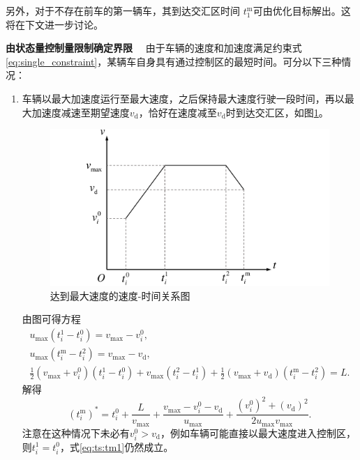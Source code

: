 另外，对于不存在前车的第一辆车，其到达交汇区时间 $t_1^\mathrm{m}$可由优化目标解出。这将在下文进一步讨论。

\textbf{由状态量控制量限制确定界限}
\ \ 由于车辆的速度和加速度满足约束式\eqref{eq:single_constraint}，某辆车自身具有通过控制区的最短时间。可分以下三种情况：
\begin{enumerate}[label=(\arabic*), wide=\parindent]
\item 车辆以最大加速度运行至最大速度，之后保持最大速度行驶一段时间，再以最大加速度减速至期望速度$v_\mathrm{d}$，恰好在速度减至$v_\mathrm{d}$时到达交汇区，如图\ref{fig:vmax}。
\begin{figure}[htbp]
\centering
\includegraphics[width=12cm]{figures/vmax.pdf}
\caption{达到最大速度的速度-时间关系图}
\label{fig:vmax}
\end{figure}

由图可得方程
\begin{gather}
u_{\max}(t_i^1-t_i^0)=v_{\max}-v_i^0,\\
u_{\max}(t_i^\mathrm{m}-t_i^2)=v_{\max}-v_\mathrm{d},\\
\frac12(v_{\max}+v_i^0)(t_i^1-t_i^0) + v_{\max}(t_i^2-t_i^1) + \frac12(v_{\max}+v_\mathrm{d})(t_i^\mathrm{m}-t_i^2) = L.
\end{gather}
解得
\begin{equation}
(t_i^\mathrm{m})^* = t_i^0 + \frac{L}{v_{\max}} + \frac{v_{\max}-v_i^0-v_\mathrm{d}}{u_{\max}} + \frac{(v_i^0)^2+(v_\mathrm{d})^2}{2u_{\max}v_{\max}}.
\label{eq:ts:tm1}
\end{equation}
注意在这种情况下未必有$v_i^0 > v_\mathrm{d}$，例如车辆可能直接以最大速度进入控制区，则$t_i^1=t_i^0$，式\eqref{eq:ts:tm1}仍然成立。


\end{enumerate}
